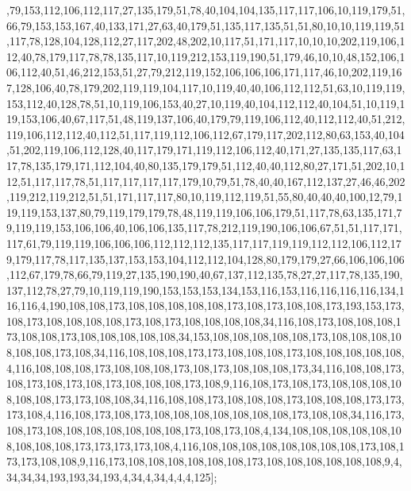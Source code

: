 ,79,153,112,106,112,117,27,135,179,51,78,40,104,104,135,117,117,106,10,119,179,51,66,79,153,153,167,40,133,171,27,63,40,179,51,135,117,135,51,51,80,10,10,119,119,51,117,78,128,104,128,112,27,117,202,48,202,10,117,51,171,117,10,10,10,202,119,106,112,40,78,179,117,78,78,135,117,10,119,212,153,119,190,51,179,46,10,10,48,152,106,106,112,40,51,46,212,153,51,27,79,212,119,152,106,106,106,171,117,46,10,202,119,167,128,106,40,78,179,202,119,119,104,117,10,119,40,40,106,112,112,51,63,10,119,119,153,112,40,128,78,51,10,119,106,153,40,27,10,119,40,104,112,112,40,104,51,10,119,119,153,106,40,67,117,51,48,119,137,106,40,179,79,119,106,112,40,112,112,40,51,212,119,106,112,112,40,112,51,117,119,112,106,112,67,179,117,202,112,80,63,153,40,104,51,202,119,106,112,128,40,117,179,171,119,112,106,112,40,171,27,135,135,117,63,117,78,135,179,171,112,104,40,80,135,179,179,51,112,40,40,112,80,27,171,51,202,10,112,51,117,117,78,51,117,117,117,117,179,10,79,51,78,40,40,167,112,137,27,46,46,202,119,212,119,212,51,51,171,117,117,80,10,119,112,119,51,55,80,40,40,40,100,12,79,119,119,153,137,80,79,119,179,179,78,48,119,119,106,106,179,51,117,78,63,135,171,79,119,119,153,106,106,40,106,106,135,117,78,212,119,190,106,106,67,51,51,117,171,117,61,79,119,119,106,106,106,112,112,112,135,117,117,119,119,112,112,106,112,179,179,117,78,117,135,137,153,153,104,112,112,104,128,80,179,179,27,66,106,106,106,112,67,179,78,66,79,119,27,135,190,190,40,67,137,112,135,78,27,27,117,78,135,190,137,112,78,27,79,10,119,119,190,153,153,153,134,153,116,153,116,116,116,116,134,116,116,4,190,108,108,173,108,108,108,108,108,173,108,173,108,108,173,193,153,173,108,173,108,108,108,108,173,108,173,108,108,108,108,34,116,108,173,108,108,108,173,108,108,173,108,108,108,108,108,34,153,108,108,108,108,108,173,108,108,108,108,108,108,173,108,34,116,108,108,108,173,173,108,108,108,173,108,108,108,108,108,4,116,108,108,108,173,108,108,108,173,108,173,108,108,108,173,34,116,108,108,173,108,173,108,173,108,173,108,108,108,173,108,9,116,108,173,108,173,108,108,108,108,108,108,173,173,108,108,34,116,108,108,173,108,108,108,173,108,108,108,173,173,173,108,4,116,108,173,108,173,108,108,108,108,108,108,108,173,108,108,34,116,173,108,173,108,108,108,108,108,108,108,173,108,173,108,4,134,108,108,108,108,108,108,108,108,108,173,173,173,173,108,4,116,108,108,108,108,108,108,108,108,173,108,173,173,108,108,9,116,173,108,108,108,108,108,108,173,108,108,108,108,108,108,9,4,34,34,34,193,193,34,193,4,34,4,34,4,4,4,125];


